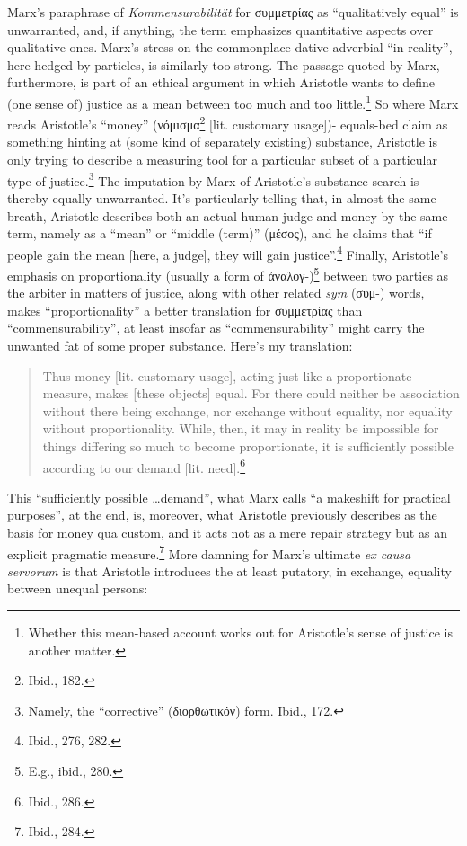 \documentclass[12pt]{article}
\begin{document}
Marx's paraphrase of \textit{Kommensurabilität} for συμμετρίας as ``qualitatively equal'' is unwarranted, and, if anything, the term emphasizes quantitative aspects over qualitative ones. Marx's stress on the commonplace dative adverbial ``in reality'', here hedged by particles, is similarly too strong. The passage quoted by Marx, furthermore, is part of an ethical argument in which Aristotle wants to define (one sense of) justice as a mean between too much and too little.\footnote{Whether this mean-based account works out for Aristotle's sense of justice is another matter.} So where Marx reads Aristotle's ``money'' (νόμισμα\footnote{Ibid., 182.} [lit. customary usage])- equals-bed claim as something hinting at (some kind of separately existing) substance, Aristotle is only trying to describe a measuring tool for a particular subset of a particular type of justice.\footnote{Namely, the ``corrective'' (διορθωτικόν) form. Ibid., 172.} The imputation by Marx of Aristotle's substance search is thereby equally unwarranted. It's particularly telling that, in almost the same breath, Aristotle describes both an actual human judge and money by the same term, namely as a ``mean'' or ``middle (term)'' (μέσος), and he claims that ``if people gain the mean [here, a judge], they will gain justice''.\footnote{Ibid., 276, 282.} Finally, Aristotle's emphasis on proportionality (usually a form of ἀναλογ-)\footnote{E.g., ibid., 280.} between two parties as the arbiter in matters of justice, along with other related \textit{sym}\- (συμ-) words, makes ``proportionality'' a better translation for συμμετρίας than ``commensurability'', at least insofar as ``commensurability'' might carry the unwanted fat of some proper substance. Here's my translation:  

\begin{quote}
\begin{singlespace}
Thus money [lit. customary usage], acting just like a proportionate measure, makes [these objects] equal. For there could neither be association without there being exchange, nor exchange without equality, nor equality without proportionality. While, then, it may in reality be impossible for things differing so much to become proportionate, it is sufficiently possible according to our demand [lit. need].\footnote{Ibid., 286.}
\end{singlespace}
\end{quote}

This ``sufficiently possible \dots  demand'', what Marx calls ``a makeshift for practical purposes'', at the end, is, moreover, what Aristotle previously describes as the basis for money qua custom, and it acts not as a mere repair strategy but as an explicit pragmatic measure.\footnote{Ibid., 284.} More damning for Marx's ultimate \textit{ex causa servorum} is that Aristotle introduces the at least putatory, in exchange, equality between unequal persons:   
\end{document}
